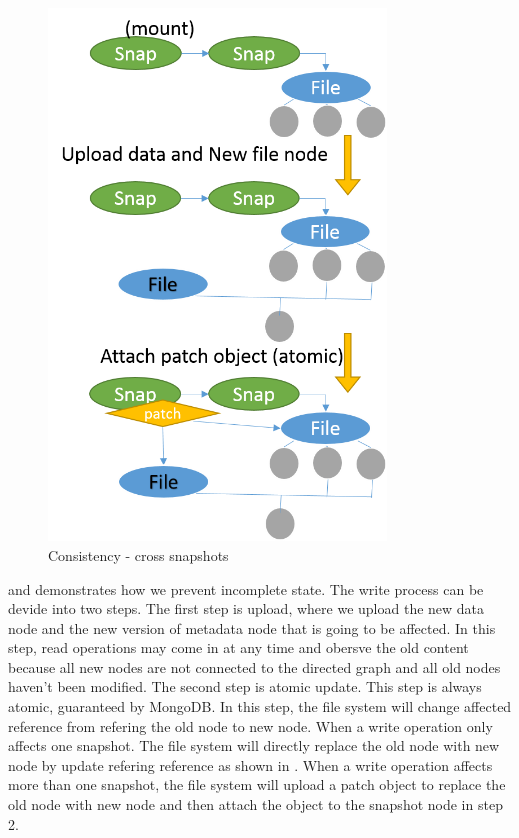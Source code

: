 \begin{figure}[hbtp]
\centering
\includegraphics[width=0.8\textwidth]{Chapter-3/figs/fig28.png}
\caption{Consistency - cross snapshots}
\label{fig:consist2}
\end{figure}

     and  demonstrates how we prevent incomplete state. The write process can be devide into two steps. The first step is upload, where we upload the new data node and the new version of metadata node that is going to be affected. In this step, read operations may come in at any time and obersve the old content because all new nodes are not connected to the directed graph and all old nodes haven't been modified. The second step is atomic update. This step is always atomic, guaranteed by MongoDB. In this step, the file system will change affected reference from refering the old node to new node. When a write operation only affects one snapshot. The file system will directly replace the old node with new node by update refering reference as shown in . When a write operation affects more than one snapshot, the file system will upload a patch object to replace the old node with new node and then attach the object to the snapshot node in step 2.

